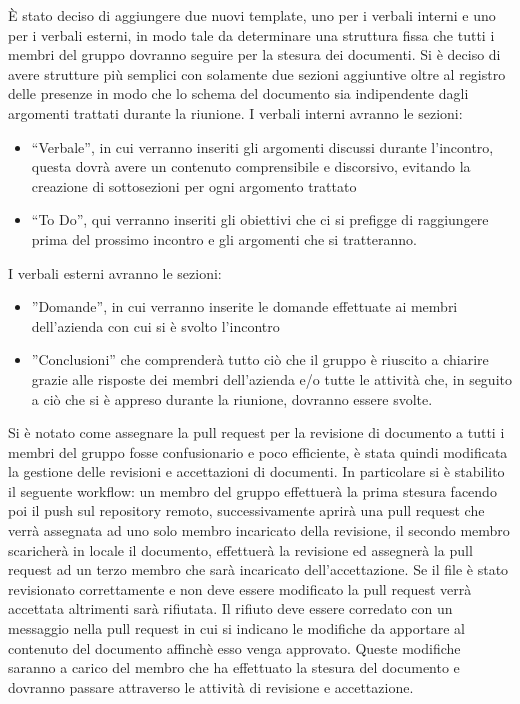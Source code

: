 \documentclass[a4paper, 12pt]{article}
\begin{document}
È stato deciso di aggiungere due nuovi template, uno per i verbali interni e uno per i verbali esterni, in modo tale da determinare una struttura fissa che tutti i membri del gruppo dovranno seguire per la stesura dei documenti.
Si è deciso di avere strutture più semplici con solamente due sezioni aggiuntive oltre al registro delle presenze in modo che lo schema del documento sia indipendente dagli argomenti trattati durante la riunione. 
I verbali interni avranno le sezioni:
\begin{itemize}
    \item “Verbale”, in cui verranno inseriti gli argomenti discussi durante l’incontro, questa dovrà avere un contenuto comprensibile e discorsivo, evitando la creazione di sottosezioni per ogni argomento trattato
    \item “To Do”, qui verranno inseriti gli obiettivi che ci si prefigge di raggiungere prima del prossimo incontro e gli argomenti che si tratteranno.
\end{itemize}
I verbali esterni avranno le sezioni:
\begin{itemize}
    \item ”Domande”, in cui verranno inserite le domande effettuate ai membri dell’azienda con cui si è svolto l’incontro
    \item ”Conclusioni” che comprenderà tutto ciò che il gruppo è riuscito a chiarire grazie alle risposte dei membri dell’azienda e/o tutte le attività che, in seguito a ciò che si è appreso durante la riunione, dovranno essere svolte.
\end{itemize}

Si è notato come assegnare la pull request per la revisione di documento a tutti i membri del gruppo fosse confusionario e poco efficiente, è stata quindi modificata  la gestione delle revisioni e accettazioni di documenti.
In particolare si è stabilito il seguente workflow: un membro del gruppo effettuerà la prima stesura facendo poi il push sul repository remoto, successivamente aprirà una pull request che verrà assegnata ad uno solo membro incaricato della revisione, il secondo membro scaricherà in locale il documento, effettuerà la revisione ed assegnerà la pull request ad un terzo membro che sarà incaricato dell’accettazione.
Se il file è stato revisionato correttamente e non deve essere modificato la pull request verrà accettata altrimenti sarà rifiutata.
Il rifiuto deve essere corredato con un messaggio nella pull request in cui si indicano le modifiche da apportare al contenuto del documento affinchè esso venga approvato.
Queste modifiche saranno a carico del membro che ha effettuato la stesura del documento e dovranno passare attraverso le attività di revisione e accettazione.
\end{document}
